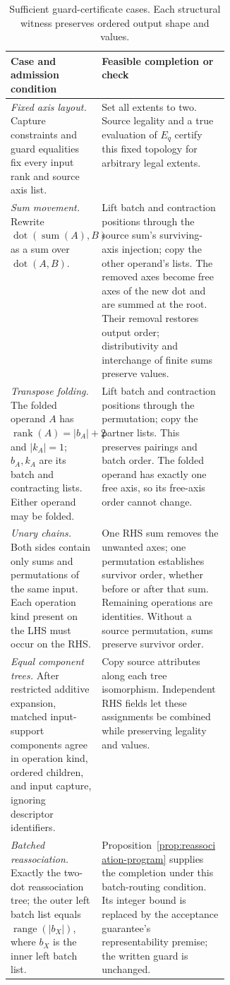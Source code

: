 \begin{table}[!htbp]
\caption{Sufficient guard-certificate cases. Each structural witness preserves
ordered output shape and values.}
\label{tab:guard-certificates}
\small
\begin{tabularx}{\linewidth}{@{}>{\raggedright\arraybackslash}p{0.36\linewidth}Y@{}}
\toprule
Case and admission condition & Feasible completion or check\\\midrule
\textit{Fixed axis layout.} Capture constraints and guard equalities fix
every input rank and source axis list.
& Set all extents to two. Source legality and a true evaluation of $E_q$
certify this fixed topology for arbitrary legal extents.\\\addlinespace
\textit{Sum movement.} Rewrite
$\operatorname{dot}(\operatorname{sum}(A),B)$ as a sum over
$\operatorname{dot}(A,B)$.
& Lift batch and contraction positions through the source sum's surviving-axis
injection; copy the other operand's lists. The removed axes become free
axes of the new dot and are summed at the root. Their removal restores
output order; distributivity and interchange of finite sums preserve values.\\\addlinespace
\textit{Transpose folding.} The folded operand $A$ has
$\operatorname{rank}(A)=|b_A|+2$ and $|k_A|=1$; $b_A,k_A$ are its
batch and contracting lists. Either operand may be folded.
& Lift batch and contraction positions through the permutation; copy the
partner lists. This preserves pairings and batch order. The folded operand
has exactly one free axis, so its free-axis order cannot change.\\\addlinespace
\textit{Unary chains.} Both sides contain only sums and permutations of the
same input. Each operation kind present on the LHS must occur on the RHS.
& One RHS sum removes the unwanted axes; one permutation establishes
survivor order, whether before or after that sum. Remaining operations
are identities. Without a source permutation, sums preserve survivor order.\\\addlinespace
\textit{Equal component trees.} After restricted additive expansion, matched
input-support components agree in operation kind, ordered children, and
input capture, ignoring descriptor identifiers.
& Copy source attributes along each tree isomorphism. Independent RHS
fields let these assignments be combined while preserving legality and values.\\\addlinespace
\textit{Batched reassociation.} Exactly the two-dot reassociation tree;
the outer left batch list equals $\operatorname{range}(|b_X|)$, where
$b_X$ is the inner left batch list.
& Proposition~\ref{prop:reassociation-program} supplies the completion
under this batch-routing condition. Its integer bound is replaced by
the acceptance guarantee's representability premise; the written
guard is unchanged.\\
\bottomrule
\end{tabularx}
\end{table}

